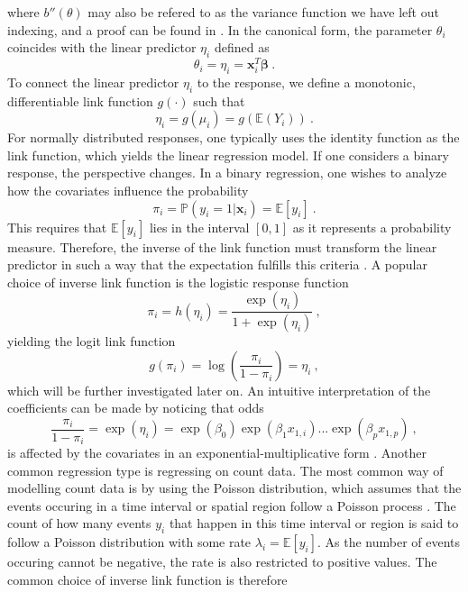 where $b''(\theta)$ may also be refered to as the variance function \citep{GLMM_book} we have left out indexing, and a proof can be found in .
In the canonical form, the parameter $\theta_{i}$ coincides with the linear predictor $\eta_{i}$ defined as 
\begin{equation}
    \theta_{i} = \eta_{i} = \mathbf{x}_{i}^T\boldsymbol{\beta}  \ . %
\end{equation}
To connect the linear predictor $\eta_{i}$ to the response, we define a monotonic, differentiable link function $g(\cdot)$ such that
\begin{equation}
    \eta_{i} = g(\mu_{i}) = g(\mathbb{E}(Y_{i}))\ .
\end{equation} 
For normally distributed responses, one typically uses the identity function as the link function, which yields the linear regression model. If one considers a binary response, the perspective changes. In a binary regression, one wishes to analyze how the covariates influence the probability 
\begin{equation}
    \pi_i = \mathbb{P}(y_i = 1 \lvert \mathbf{x}_i) = \mathbb{E}[y_i] \ .
\end{equation}
This requires that $\mathbb{E}[y_i]$ lies in the interval $[0, 1]$ as it represents a probability measure. Therefore, the inverse of the link function must transform the linear predictor in such a way that the expectation fulfills this criteria \citep{GLMM_book}. A popular choice of inverse link function is the logistic response function 
\begin{equation}
    \pi_i = h(\eta_i) = \frac{\exp(\eta_i)}{1 + \exp(\eta_i)} \ , 
\end{equation} 
yielding the logit link function
\begin{equation}
    g(\pi_i) = \log\left(\frac{\pi_i}{1-\pi_i}\right) = \eta_i \ ,
\end{equation}
which will be further investigated later on. An intuitive interpretation of the coefficients can be made by noticing that odds
\begin{equation}
    \frac{\pi_i}{1-\pi_i} = \exp(\eta_i) = \exp(\beta_0)\exp(\beta_1x_{1, i})...\exp(\beta_px_{1, p}) \ ,
\end{equation}
is affected by the covariates in an exponential-multiplicative form \citep{GLMM_book}. Another common regression type is regressing on count data. The most common way of modelling count data is by using the Poisson distribution, which assumes that the events occuring in a time interval or spatial region follow a Poisson process \citep{GLMM_book_old}. The count of how many events $y_i$ that happen in this time interval or region is said to follow a Poisson distribution with some rate $\lambda_i = \mathbb{E}[y_i]$. As the number of events occuring cannot be negative, the rate is also restricted to positive values. The common choice of inverse link function is therefore 
